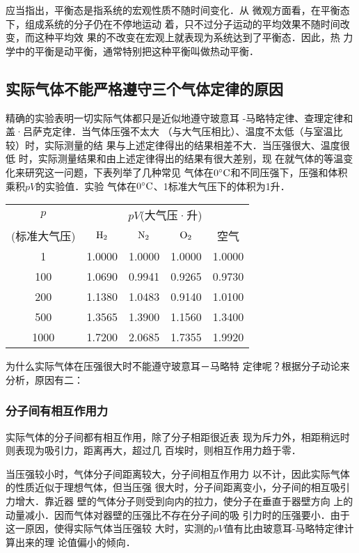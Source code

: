 应当指出，平衡态是指系统的宏观性质不随时间变化．从
微观方面看，在平衡态下，组成系统的分子仍在不停地运动
着，只不过分子运动的平均效果不随时间改变，而这种平均效
果的不改变在宏观上就表现为系统达到了平衡态．因此，热
力学中的平衡是动平衡，通常特别把这种平衡叫做热动平衡．

\subsection{实际气体不能严格遵守三个气体定律的原因}
精确的实验表明一切实际气体都只是近似地遵守玻意耳
-马略特定律、查理定律和盖·吕萨克定律．当气体压强不太大
（与大气压相比）、温度不太低（与室温比较）时，实际测量的结
果与上述定律得出的结果相差不大．当压强很大、温度很低
时，实际测量结果和由上述定律得出的结果有很大差别，现
在就气体的等温变化来研究这一问题，下表列举了几种常见
气体在$0^{\circ}{\rm C}$和不同压强下，压强和体积乘积$pV$的实验值．实验
气体在$0^{\circ}{\rm C}$、1标准大气压下的体积为1升．

\begin{center}
\begin{tabular}{c|cccc}
    \hline
    $p$ & \multicolumn{4}{|c}{$pV$(大气压·升)}\\
    \cline{2-5}
(标准大气压)&  ${\rm H}_2$&  ${\rm N}_2$&  ${\rm O}_2$&  空气\\
\hline
1&1.0000&1.0000&1.0000&1.0000\\
100&1.0690&0.9941&0.9265&0.9730\\
200&1.1380&1.0483&0.9140&1.0100\\
500&1.3565&1.3900&1.1560&1.3400\\
1000&1.7200&2.0685&1.7355&1.9920\\
\hline
\end{tabular}
\end{center}

为什么实际气体在压强很大时不能遵守玻意耳－马略特
定律呢？根据分子动论来分析，原因有二：

\subsubsection{分子间有相互作用力}
实际气体的分子间都有相互作用，除了分子相距很近表
现为斥力外，相距稍远时则表现为吸引力，距离再大，超过几
百埃时，则相互作用力趋于零．

当压强较小时，气体分子间距离较大，分子间相互作用力
以不计，因此实际气体的性质近似于理想气体，但当压强
很大时，分子间距离变小，分子间的相互吸引力增大．靠近器
壁的气体分子则受到向内的拉力，使分子在垂直于器壁方向
上的动量减小．因而气体对器壁的压强比不存在分子间的吸
引力时的压强要小．由于这一原因，使得实际气体当压强较
大时，实测的$pV$值有比由玻意耳-马略特定律计算出来的理
论值偏小的倾向．

